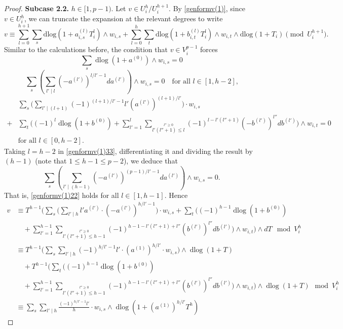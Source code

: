 \documentclass[11pt]{amsart}
\newcommand{\eq}[2]{\begin{equation}\label{#1}#2 \end{equation}}
\newcommand{\dlog}{\operatorname{dlog}}
\theoremstyle{plain}
\theoremstyle{definition}
\numberwithin{equation}{prop}
\begin{document}
\begin{proof}
\textbf{Subcase 2.2.} $h \in[1, p-1)$. 
Let $v \in U^h_i / U^{h+1}_i$. By \eqref{genformv(1)}, since $v \in U^h_i$, we can truncate the expansion at the relevant degrees to write
\[
v \equiv \sum_{l=0}^{h+1} \sum_s \mathrm{dlog}(1 + a_{i,s}^{(l)}T_i^l) \wedge w_{i,s} + \sum_{l=0}^h \sum_t \mathrm{dlog}(1 + b_{i,t}^{(l)}T_i^l) \wedge w_{i,t} \wedge \mathrm{dlog}(1 + T_i) \pmod{U^{h+1}_i}.
\]
Similar to the calculations before, 
the condition that $v\in V_i^{p-1}$ forces
\eq{genformv(1)11}{\sum_s\dlog(1+a^{(0)})\wedge  w_{i,s}=0}
\eq{genformv(1)22}{
\sum_s
\left(
\sum_{l'\mid l} (-a^{(l')})^{l/l'-1}da^{(l')}
\right)\wedge w_{i,s}=0
\quad
\text{for all $l\in[1,h-2]$,}
}
\begin{align}
\label{genformv(1)33}
&\sum_s 
\Bigg(
\sum_{l'\mid (l+1)}
(-1)^{(l+1)/l'-1} l'  (a^{(l')})^{(l+1)/l'}
\Bigg)\cdot  w_{i,s}
\\
+&
\sum_t 
\Bigg(
(-1)^l\dlog(1+b^{(0)})
+
\sum_{l'=1}^l \sum_{
\stackrel{l''\ge 0}{ l'(l''+1)\le l}}
(-1)^{l-l'(l''+1)}(-b^{(l')})^{l''}db^{(l')}
\Bigg)\wedge w_{i,t}
=0
\nonumber
\\
&\text{for all $l\in[0,h-2]$.}
\nonumber
\end{align}
Taking $l=h-2$ in
\eqref{genformv(1)33}, differentiating it and dividing the result by  $(h-1)$ 
(note that $1\le h-1\le p-2$), we deduce that
$$\sum_s 
\left(
\sum_{l'\mid (h-1)} (-a^{(l')})^{(p-1)/l'-1}da^{(l')}
\right)\wedge w_{i,s}=0.
$$
That is, \eqref{genformv(1)22} holds for all $l\in [1,h-1]$.
Hence
\begin{align*} 
v&\equiv
T^{h-1}\Bigg(
\sum_s
\Bigg(
\sum_{l'\mid h} l' a^{(l')}\cdot  (-a^{(l')})^{h/l'-1}
\Bigg)\cdot w_{i,s}
+
\sum_t
\Bigg(
(-1)^{h-1}\dlog(1+b^{(0)})
\\
&\quad 
+
\sum_{l'=1}^{h-1} \sum_{
\stackrel{l''\ge 0}{ l'(l''+1)\le h-1}}
(-1)^{h-1-l'(l''+1)+l''}(b^{(l')})^{l''}db^{(l')}
\Bigg)\wedge w_{i,t}
\Bigg)
\wedge dT
\mod V_i^h
\\
&
\equiv
T^{h-1}\Bigg(
\sum_s
\sum_{l'\mid h}
(-1)^{h/l'-1} l'\cdot  (a^{(1)})^{h/l'}
\cdot  w_{i,s}
\Bigg)
\wedge \dlog(1+ T)
\\&\quad +
T^{h-1}\Bigg(
\sum_t
\Bigg(
(-1)^{h-1}\dlog(1+b^{(0)})
\nonumber
\\&\quad +
\sum_{l'=1}^{h-1} \sum_{
\stackrel{l''\ge 0}{ l'(l''+1)\le h-1}}
(-1)^{h-1-l'(l''+1)+l''}(b^{(l')})^{l''}db^{(l')}
\Bigg)\wedge w_{i,t}
\Bigg)
\wedge \dlog(1+T)
\mod V_i^h
\\
&
\equiv
 \sum_s
\sum_{l'\mid h}
\frac{(-1)^{h/l'-1} l'}{h}\cdot  w_{i,s}
\wedge \dlog(1+ (a^{(1)})^{h/l'}T^h)

\end{align*}
\end{proof}
\end{document}

